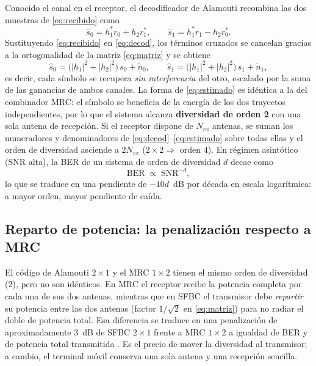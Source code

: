\documentclass[conference,onecolumn]{IEEEtran}
\begin{document}
Conocido el canal en el receptor, el decodificador de Alamouti recombina las dos muestras de \eqref{eq:recibido} como
\begin{equation}
\hat{s}_0 = h_1^{*} r_0 + h_2 r_1^{*}, \qquad
\hat{s}_1 = h_1^{*} r_1 - h_2 r_0^{*}.
\label{eq:decod}
\end{equation}
Sustituyendo \eqref{eq:recibido} en \eqref{eq:decod}, los t\'erminos cruzados se cancelan gracias a la ortogonalidad de la matriz \eqref{eq:matriz} y se obtiene
\begin{equation}
\hat{s}_0 = \big(|h_1|^{2}+|h_2|^{2}\big)\,s_0 + \tilde{n}_0, \qquad
\hat{s}_1 = \big(|h_1|^{2}+|h_2|^{2}\big)\,s_1 + \tilde{n}_1,
\label{eq:estimado}
\end{equation}
es decir, cada s\'imbolo se recupera \emph{sin interferencia} del otro, escalado por la suma de las ganancias de ambos canales. La forma de \eqref{eq:estimado} es id\'entica a la del combinador MRC: el s\'imbolo se beneficia de la energ\'ia de los dos trayectos independientes, por lo que el sistema alcanza \textbf{diversidad de orden 2} con una sola antena de recepci\'on. Si el receptor dispone de $N_{rx}$ antenas, se suman los numeradores y denominadores de \eqref{eq:decod}--\eqref{eq:estimado} sobre todas ellas y el orden de diversidad asciende a $2N_{rx}$ ($2\times2\Rightarrow$ orden $4$). En r\'egimen asint\'otico (SNR alta), la BER de un sistema de orden de diversidad $d$ decae como
\begin{equation}
\mathrm{BER}\;\propto\;\mathrm{SNR}^{-d},
\label{eq:diversidad}
\end{equation}
lo que se traduce en una pendiente de $-10d$~dB por d\'ecada en escala logar\'itmica: a mayor orden, mayor pendiente de ca\'ida.

\subsection{Reparto de potencia: la penalizaci\'on respecto a MRC}

El c\'odigo de Alamouti $2\times1$ y el MRC $1\times2$ tienen el mismo orden de diversidad (2), pero no son id\'enticos. En MRC el receptor recibe la potencia completa por cada una de sus dos antenas, mientras que en SFBC el transmisor debe \emph{repartir} su potencia entre las dos antenas (factor $1/\sqrt{2}$ en \eqref{eq:matriz}) para no radiar el doble de potencia total. Esa diferencia se traduce en una penalizaci\'on de aproximadamente $3$~dB de SFBC $2\times1$ frente a MRC $1\times2$ a igualdad de BER y de potencia total transmitida \cite{alamouti1998}. Es el precio de mover la diversidad al transmisor; a cambio, el terminal m\'ovil conserva una sola antena y una recepci\'on sencilla.
\end{document}
